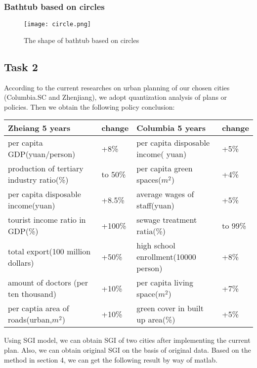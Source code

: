 \documentclass{mcmthesis}
\begin{document}
\subsubsection{Bathtub based on circles}
\begin{figure}[H]
\centerline{\texttt{[image: circle.png]}}
\caption{The shape of bathtub based on circles}
\label{circle}	
\end{figure}

\subsection{Task 2}%

According to the current researches on urban planning of our chosen cities (Columbia.SC and Zhenjiang), we adopt quantization analysis of plans or policies. Then we obtain the following policy conclusion:\\
\begin{table}[h]

\centering
{}
\begin{tabular}{p{5.2cm}|p{1.2cm}|p{5.2cm}|p{1.2cm}}
\hline
\bf Zheiang 5 years	 & \bf change	 & \bf Columbia 5 years	& \bf change \\
\hline
 per capita GDP(yuan/person)	& +8\%	& per capita disposable income( yuan)	& +5\% \\
production of tertiary industry ratio(\%)	& to 50\%	& per capita green spaces($m^2$)	& +4\% \\
per capita disposable income(yuan)	& +8.5\%	& average wages of staff(yuan)	& +5\% \\
tourist income ratio in GDP(\%)	& +100\%	& sewage treatment ratia(\%)	& to 99\% \\
total export(100 million dollars)	& +50\%	& high school enrollment(10000 person)	& +8\% \\
amount of doctors (per ten thousand)	& +10\%	& per capita living space($m^2$)	& +7\% \\
per captia area of roads(urban,$m^2$)	& +10\%	& green cover in built up area(\%)	& +5\% \\
\hline
\end{tabular}
\end{table}

\noindent Using SGI model, we can obtain SGI of two cities after implementing the current plan. Also, we can obtain original SGI on the basis of original data. Based on the method in section 4, we can get the following result by way of matlab.\\
\end{document}
